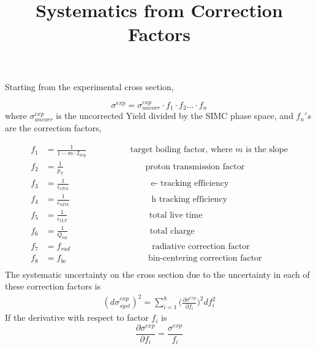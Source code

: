 \documentclass[11pt]{article}
\title{\textbf{Systematics from Correction Factors}}
\begin{document}
\maketitle

Starting from the experimental cross section,

\begin{equation}
  \sigma^{exp} = \sigma^{exp}_{uncorr} \cdot f_{1} \cdot f_{2} . . . \cdot f_{n}
\end{equation}
where $\sigma^{exp}_{uncorr}$ is the uncorrected Yield divided by the SIMC phase space, and $f_{n}'s$ are the correction factors,

\begin{align*}
  f_{1} &= \frac{1}{1-m\cdot I_{avg}}   \hspace{2cm}  \text{        target boiling factor, where $m$ is the slope} \\
  f_{2} &= \frac{1}{p_{T}}              \hspace{4cm}   \text{proton transmission factor}  \\
  f_{3} &= \frac{1}{\epsilon_{eTrk}}   \hspace{4cm}   \text{e-  tracking efficiency} \\
  f_{4} &= \frac{1}{\epsilon_{hTrk}}   \hspace{4cm}   \text{h  tracking efficiency} \\
  f_{5} &= \frac{1}{\epsilon_{tLT}}   \hspace{4cm}   \text{total live time} \\
  f_{6} &= \frac{1}{Q_{tot}}          \hspace{4cm}   \text{total charge} \\
  f_{7} &= f_{rad} \hspace{4cm}   \text{radiative correction factor} \\
  f_{8} &= f_{bc}  \hspace{4cm}   \text{bin-centering correction factor} \\
\end{align*}
The systematic uncertainty on the cross section due to the uncertainty in each of these correction factors is
\begin{align}
  (d\sigma^{exp}_{syst})^{2} = \sum_{i=1}^{8} \Big( \frac{\partial\sigma^{exp}}{\partial f_{i}}\Big)^{2} df_{i}^{2}
\end{align}
If the derivative with respect to factor $f_{i}$ is
\begin{equation}
  \frac{\partial\sigma^{exp}}{\partial f_{i}} = \frac{\sigma^{exp}}{f_{i}}
\end{equation}
\end{document}
